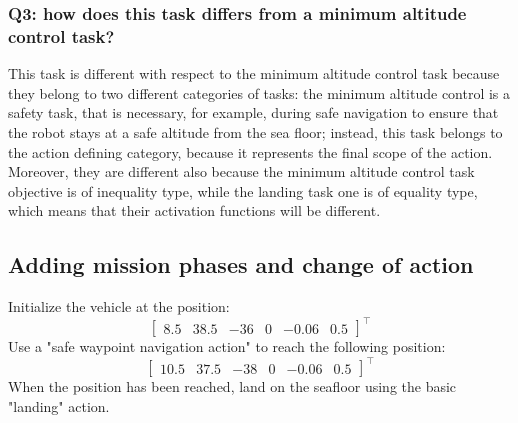 \documentclass{article}
\begin{document}
\subsubsection{Q3: how does this task differs from a minimum altitude control task?}
This task is different with respect to the minimum altitude control task because they belong to two different categories of tasks: the minimum altitude control is a safety task, that is necessary, for example, during safe navigation to ensure that the robot stays at a safe altitude from the sea floor; instead, this task belongs to the action defining category, because it represents the final scope of the action.\\
Moreover, they are different also because the minimum altitude control task objective is of inequality type, while the landing task one is of equality type, which means that their activation functions will be different.

\subsection{Adding mission phases and change of action}
Initialize the vehicle at the position:
\begin{displaymath}
\begin{bmatrix} 8.5 & 38.5 & -36 & 0 & -0.06 & 0.5 \end{bmatrix}^\top
\end{displaymath}
Use a "safe waypoint navigation action" to reach the following position:
\begin{displaymath}
\begin{bmatrix} 10.5 & 37.5 & -38 & 0 & -0.06 & 0.5 \end{bmatrix}^\top
\end{displaymath}
When the position has been reached, land on the seafloor using the basic "landing" action.
\end{document}
